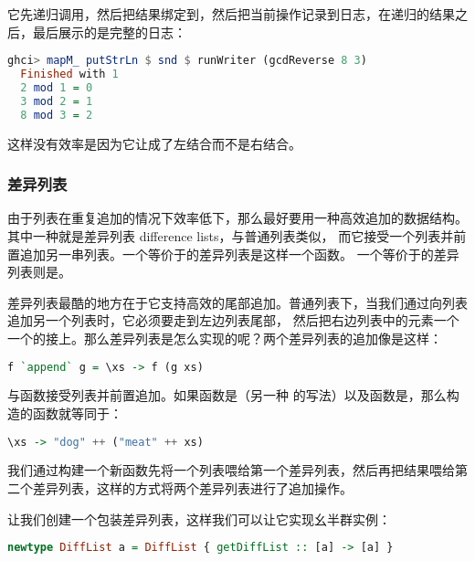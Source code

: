 \documentclass[./main.tex]{subfiles}
\begin{document}
它先递归调用，然后把结果绑定到，然后把当前操作记录到日志，在递归的结果之后，最后展示的是完整的日志：

\begin{lstlisting}[language=Haskell]
  ghci> mapM_ putStrLn $ snd $ runWriter (gcdReverse 8 3)
  Finished with 1
  2 mod 1 = 0
  3 mod 2 = 1
  8 mod 3 = 2
\end{lstlisting}

这样没有效率是因为它让\acode{++}成了左结合而不是右结合。

\subsubsection*{差异列表}

由于列表在重复追加的情况下效率低下，那么最好要用一种高效追加的数据结构。其中一种就是差异列表 difference lists，与普通列表类似，
而它接受一个列表并前置追加另一串列表。一个等价于\acode{[1,2,3]}的差异列表是这样一个函数。
一个等价于\acode{[]}的差异列表则是。

差异列表最酷的地方在于它支持高效的尾部追加。普通列表下，当我们通过\acode{++}向列表追加另一个列表时，它必须要走到左边列表尾部，
然后把右边列表中的元素一个一个的接上。那么差异列表是怎么实现的呢？两个差异列表的追加像是这样：

\begin{lstlisting}[language=Haskell]
  f `append` g = \xs -> f (g xs)
\end{lstlisting}

与函数接受列表并前置追加。如果函数是（另一种
的写法）以及函数是，那么构造的函数就等同于：

\begin{lstlisting}[language=Haskell]
  \xs -> "dog" ++ ("meat" ++ xs)
\end{lstlisting}

我们通过构建一个新函数先将一个列表喂给第一个差异列表，然后再把结果喂给第二个差异列表，这样的方式将两个差异列表进行了追加操作。

让我们创建一个包装差异列表，这样我们可以让它实现幺半群实例：

\begin{lstlisting}[language=Haskell]
  newtype DiffList a = DiffList { getDiffList :: [a] -> [a] }
\end{lstlisting}
\end{document}
